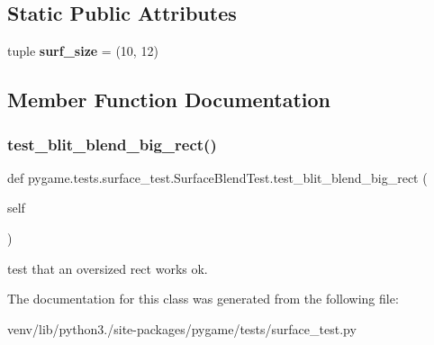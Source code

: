 \subsection*{Static Public Attributes}
\begin{DoxyCompactItemize}
\item 
\mbox{\label{classpygame_1_1tests_1_1surface__test_1_1_surface_blend_test_acc0faa1fcf7f9a23c6c04d768b9ed468}} 
tuple {\bfseries surf\+\_\+size} = (10, 12)
\end{DoxyCompactItemize}


\subsection{Member Function Documentation}
\mbox{\label{classpygame_1_1tests_1_1surface__test_1_1_surface_blend_test_aa3944e83dda81a31d43ea556ac93a3f9}} 
\subsubsection{\texorpdfstring{test\+\_\+blit\+\_\+blend\+\_\+big\+\_\+rect()}{test\_blit\_blend\_big\_rect()}}
{\footnotesize\ttfamily def pygame.\+tests.\+surface\+\_\+test.\+Surface\+Blend\+Test.\+test\+\_\+blit\+\_\+blend\+\_\+big\+\_\+rect (\begin{DoxyParamCaption}\item[{}]{self }\end{DoxyParamCaption})}

\begin{DoxyVerb}test that an oversized rect works ok.
\end{DoxyVerb}
 

The documentation for this class was generated from the following file\+:\begin{DoxyCompactItemize}
\item 
venv/lib/python3./site-\/packages/pygame/tests/surface\+\_\+test.\+py\end{DoxyCompactItemize}
